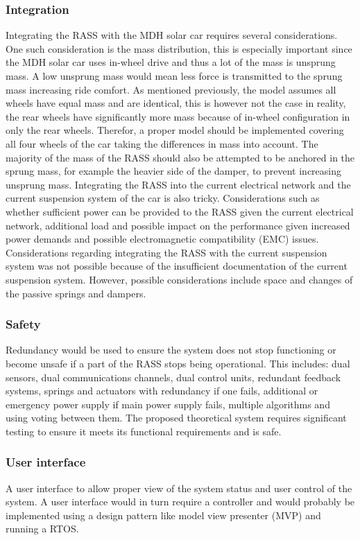 \subsubsection{Integration}
Integrating the RASS with the MDH solar car requires several considerations. One such consideration is the mass distribution, this is especially important since the MDH solar car uses in-wheel drive and thus a lot of the mass is unsprung mass. A low unsprung mass would mean less force is transmitted to the sprung mass increasing ride comfort. As mentioned previously, the model assumes all wheels have equal mass and are identical, this is however not the case in reality, the rear wheels have significantly more mass because of in-wheel configuration in only the rear wheels. Therefor, a proper model should be implemented covering all four wheels of the car taking the differences in mass into account. The majority of the mass of the RASS should also be attempted to be anchored in the sprung mass, for example the heavier side of the damper, to prevent increasing unsprung mass.
Integrating the RASS into the current electrical network and the current suspension system of the car is also tricky.
Considerations such as whether sufficient power can be provided to the RASS given the current electrical network, additional load and possible impact on the performance given increased power demands and possible electromagnetic compatibility (EMC) issues.
Considerations regarding integrating the RASS with the current suspension system was not possible because of the insufficient documentation of the current suspension system. However, possible considerations include space and changes of the passive springs and dampers.

\subsubsection{Safety}
Redundancy would be used to ensure the system does not stop functioning or become unsafe if a part of the RASS stops being operational. This includes: dual sensors, dual communications channels, dual control units, redundant feedback systems, springs and actuators with redundancy if one fails, additional or emergency power supply if main power supply fails, multiple algorithms and using voting between them.
The proposed theoretical system requires significant testing to ensure it meets its functional requirements and is safe.

\subsubsection{User interface}
A user interface to allow proper view of the system status and user control of the system. A user interface would in turn require a controller and would probably be implemented using a design pattern like model view presenter (MVP) and running a RTOS.

